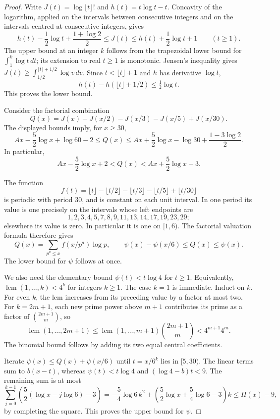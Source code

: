 \documentclass[11pt]{article}
\numberwithin{equation}{section}
\theoremstyle{definition}\newtheorem{definition}[theorem]{Definition}
\theoremstyle{remark}\newtheorem{remark}[theorem]{Remark}
\begin{document}
\begin{proof}
Write $J(t)=\log\lfloor t\rfloor!$ and $h(t)=t\log t-t$.
Concavity of the logarithm, applied on the intervals between consecutive
integers and on the intervals centred at consecutive integers, gives
\[
 h(t)-\frac12\log t+\frac{1+\log2}{2}
 \le J(t)\le h(t)+\frac12\log t+1\qquad(t\ge1).
\]
The upper bound at an integer $k$ follows from the
trapezoidal lower bound for $\int_1^k\log t\,dt$; its extension to real
$t\ge1$ is monotonic. Jensen's inequality gives
$J(t)\ge\int_{1/2}^{\lfloor t\rfloor+1/2}\log v\,dv$.
Since $t<\lfloor t\rfloor+1$ and $h$ has derivative $\log t$,
\[
 h(t)-h(\lfloor t\rfloor+1/2)\le\tfrac12\log t.
\]
This proves the lower bound.

Consider the factorial combination
\[
 Q(x)=J(x)-J(x/2)-J(x/3)-J(x/5)+J(x/30).
\]
The displayed bounds imply, for $x\ge30$,
\[
 Ax-\frac52\log x+\log60-2
 \le Q(x)\le
 Ax+\frac52\log x-\log30+\frac{1-3\log2}{2}.
\]
In particular,
\begin{equation}\label{arith:eq:elementary-factorial-combination}
 Ax-\frac52\log x+2<Q(x)<Ax+\frac52\log x-3.
\end{equation}

The function
\[
 f(t)=\lfloor t\rfloor-\lfloor t/2\rfloor-\lfloor t/3\rfloor
                      -\lfloor t/5\rfloor+\lfloor t/30\rfloor
\]
is periodic with period $30$, and is constant on each unit interval.
In one period its value is one precisely on the intervals whose left
endpoints are
\[
             1,2,3,4,5,7,8,9,11,13,14,17,19,23,29;
\]
elsewhere its value is zero. In particular it is one on $[1,6)$.
The factorial valuation formula therefore gives
\[
 Q(x)=\sum_{p^a\le x}f(x/p^a)\log p,\qquad
                \psi(x)-\psi(x/6)\le Q(x)\le\psi(x).
\]
The lower bound for $\psi$ follows at once.

We also need the elementary bound $\psi(t)<t\log4$ for $t\ge1$.
Equivalently, $\operatorname{lcm}(1,\ldots,k)<4^k$ for integers $k\ge1$.
The case $k=1$ is immediate. Induct on $k$. For even $k$, the lcm increases from its preceding value
by a factor at most two. For $k=2m+1$, each new prime power above $m+1$
contributes its prime as a factor of $\binom{2m+1}{m}$, so
\[
 \operatorname{lcm}(1,\ldots,2m+1)
 \le\operatorname{lcm}(1,\ldots,m+1)\binom{2m+1}{m}
 <4^{m+1}4^m.
\]
The binomial bound follows by adding its two equal central coefficients.

Iterate $\psi(x)\le Q(x)+\psi(x/6)$ until
$t=x/6^k$ lies in $[5,30)$. The linear terms sum to $b(x-t)$, whereas
$\psi(t)<t\log4$ and $(\log4-b)t<9$. The remaining sum is at most
\[
 \sum_{j=0}^{k-1}\left(\frac52(\log x-j\log6)-3\right)
 =-\frac54\log6\,k^2+
       \left(\frac52\log x+\frac54\log6-3\right)k
 \le H(x)-9,
\]
by completing the square. This proves the upper bound for $\psi$.


\end{proof}
\end{document}
